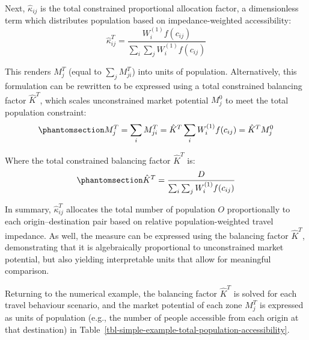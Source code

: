\documentclass[
  10pt,
  letterpaper,
]{article}
\begin{document}
Next, \(\hat \kappa_{ij}\) is the total constrained proportional
allocation factor, a dimensionless term which distributes population
based on impedance-weighted accessibility: \[
\hat \kappa_{ij}^T = \frac{W^{(1)}_i f(c_{ij})}{\sum_i\sum_j W^{(1)}_if(c_{ij})}
\]

This renders \(M_j^T\) (equal to \(\sum_jM_{ji}^T\)) into units of
population. Alternatively, this formulation can be rewritten to be
expressed using a total constrained balancing factor \(\hat K^T\), which
scales unconstrained market potential \(M_j^0\) to meet the total
population constraint:
\begin{equation}\phantomsection\label{eq-total-constrained-market-potential}{
M^T_j = \sum_i M^T_{ji} = \hat K^T \sum_i W^{(1)}_if(c_{ij}) = \hat K^T  M^0_j
}\end{equation}

Where the total constrained balancing factor \(\hat K^T\) is:
\begin{equation}\phantomsection\label{eq-total-population-balancing-factor}{
\hat K^T = \frac{D}{\sum_i\sum_j W^{(1)}_if(c_{ij})}
}\end{equation}

In summary, \(\hat \kappa_{ij}^T\) allocates the total number of
population \(O\) proportionally to each origin--destination pair based
on relative population-weighted travel impedance. As well, the measure
can be expressed using the balancing factor \(\hat K^T\), demonstrating
that it is algebraically proportional to unconstrained market potential,
but also yielding interpretable units that allow for meaningful
comparison.

Returning to the numerical example, the balancing factor \(\hat K^T\) is
solved for each travel behaviour scenario, and the market potential of
each zone \(M^T_j\) is expressed as units of population (e.g., the
number of people accessible from each origin at that destination) in
Table~\ref{tbl-simple-example-total-population-accessibility}.
\end{document}

